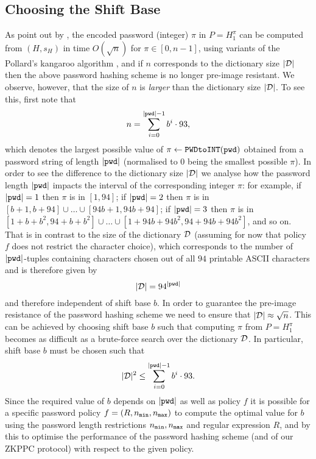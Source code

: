 \subsection{Choosing the Shift Base}\label{rem:basischoice}
As point out by \citet{BenhamoudaP13}, the encoded password (integer) $\pi$ in $P=H_1^\pi$ can be computed from $(H, s_H)$ in time $O(\sqrt{n})$ for $\pi \in [0,n-1]$, \eg using variants of the Pollard's kangaroo algorithm \cite{Pollard78}, and if $n$ corresponds to the dictionary size $|\mathcal{D}|$ then the above password hashing scheme is no longer pre-image resistant. 
We observe, however, that the size of $n$ is \emph{larger} than the dictionary size $|\mathcal{D}|$. 
To see this, first note that 
\[n=\sum_{i=0}^{|\mathtt{pwd}|-1}b^i\cdot 93,\] 
which denotes the largest possible value of $\pi \gets \texttt{PWDtoINT}(\mathtt{pwd})$ obtained from a password string of length $|\mathtt{pwd}|$ (normalised to $0$ being the smallest possible $\pi$). 
In order to see the difference to the dictionary size $|\mathcal{D}|$ we analyse how the password length $|\mathtt{pwd}|$ impacts the interval of the corresponding integer $\pi$: for example, if $|\mathtt{pwd}| = 1$ then $\pi$ is in $[1,94]$; if $|\mathtt{pwd}|=2$ then $\pi$ is in $[b+1,b+94]\cup \dots \cup[94b+1,94b+94]$; if $|\mathtt{pwd}|=3$ then $\pi$ is in  $[1+b+b^2,94+b+b^2]\cup\dots\cup[1+94b+94b^2,94+94b+94b^2]$, and so on. 
That is in contrast to the size of the dictionary $\mathcal{D}$ (assuming for now that policy $f$ does not restrict the character choice), which corresponds to the number of $|\mathtt{pwd}|$-tuples containing characters chosen out of all $94$ printable \ac{ASCII} characters and is therefore given by 
\[|\mathcal{D}| = 94^{|\mathtt{pwd}|}\]
and therefore independent of shift base $b$.
In order to guarantee the pre-image resistance of the password hashing scheme we need to ensure that $|\mathcal{D}| \approx \sqrt{n}$.
This can be achieved by choosing shift base $b$ such that computing $\pi$ from $P=H_1^\pi$ becomes as difficult as a brute-force search over the dictionary $\mathcal{D}$. 
In particular, shift base $b$ must be chosen such that 
\begin{equation}\label{eq:hashlimit}
  |\mathcal{D}|^2\leq \sum_{i=0}^{|\mathtt{pwd}|-1}b^i\cdot 93.
\end{equation}
Since the required value of $b$ depends on $|\mathtt{pwd}|$ as well as policy $f$ it is possible for a specific password policy $f=(R,{n_\mathtt{min}},{n_\mathtt{max}})$ to compute the optimal value for $b$ using the password length restrictions ${n_\mathtt{min}},{n_\mathtt{max}}$ and regular expression $R$, and by this to optimise the performance of the password hashing scheme (and of our ZKPPC protocol) with respect to the given policy. 
